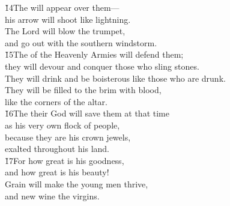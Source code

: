 \begin{poetry}
\poeml \v{14}The  will appear over them--- \\
\poemll    his arrow will shoot like lightning. \\
\poeml The Lord  will blow the trumpet, \\
\poemll    and go out with the southern windstorm. \\
\poeml \v{15}The  of the Heavenly Armies will defend them; \\
\poemll    they will devour and conquer those who sling stones. \\
\poeml They will drink and be boisterous like those who are drunk. \\
\poemll    They will be filled to the brim with blood, \\
\poemlll       like the corners of the altar. \\
\poeml \v{16}The  their God will save them at that time \\
\poemll    as his very own flock of people, \\
\poeml because they are his crown jewels, \\
\poemll    exalted throughout his land. \\
\poeml \v{17}For how great is his goodness, \\
\poemll    and how great is his beauty! \\
\poeml Grain will make the young men thrive, \\
\poemll    and new wine the virgins.
\end{poetry}

